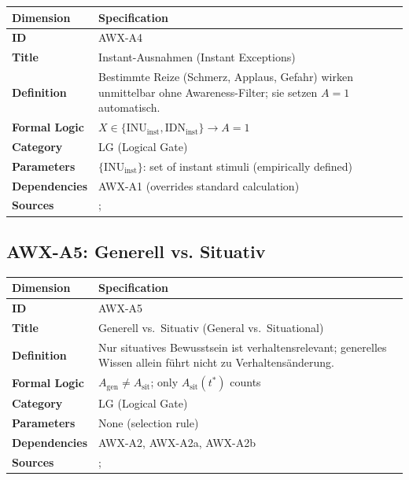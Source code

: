 \begin{table}[htbp]
\small
\begin{tabular}{p{3cm}p{11cm}}
\toprule
\textbf{Dimension} & \textbf{Specification} \\
\midrule
\textbf{ID} & AWX-A4 \\
\textbf{Title} & Instant-Ausnahmen (Instant Exceptions) \\
\textbf{Definition} & Bestimmte Reize (Schmerz, Applaus, Gefahr) wirken unmittelbar ohne Awareness-Filter; sie setzen $A = 1$ automatisch. \\
\textbf{Formal Logic} & $X \in \{\text{INU}_{\text{inst}}, \text{IDN}_{\text{inst}}\} \rightarrow A = 1$ \\
\textbf{Category} & LG (Logical Gate) \\
\textbf{Parameters} & $\{\text{INU}_{\text{inst}}\}$: set of instant stimuli (empirically defined) \\
\textbf{Dependencies} & AWX-A1 (overrides standard calculation) \\
\textbf{Sources} & \citet{PAP-kahneman2003maps}; \citet{loewenstein2001risk} \\
\bottomrule
\end{tabular}
\end{table}


\subsection{AWX-A5: Generell vs. Situativ}

\begin{table}[htbp]
\small
\begin{tabular}{p{3cm}p{11cm}}
\toprule
\textbf{Dimension} & \textbf{Specification} \\
\midrule
\textbf{ID} & AWX-A5 \\
\textbf{Title} & Generell vs.\ Situativ (General vs.\ Situational) \\
\textbf{Definition} & Nur situatives Bewusstsein ist verhaltensrelevant; generelles Wissen allein führt nicht zu Verhaltensänderung. \\
\textbf{Formal Logic} & $A_{\text{gen}} \neq A_{\text{sit}}$; only $A_{\text{sit}}(t^*)$ counts \\
\textbf{Category} & LG (Logical Gate) \\
\textbf{Parameters} & None (selection rule) \\
\textbf{Dependencies} & AWX-A2, AWX-A2a, AWX-A2b \\
\textbf{Sources} & \citet{bargh1996automaticity}; \citet{PAP-kahneman2003maps} \\
\bottomrule
\end{tabular}
\end{table}

